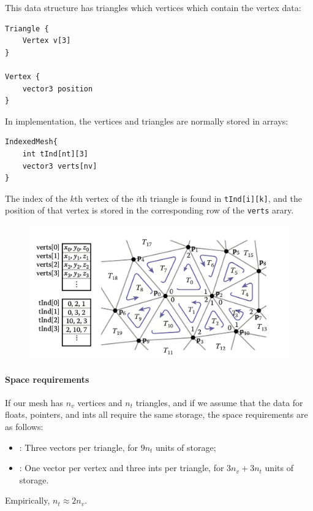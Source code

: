 \documentclass[11pt]{article}
\numberwithin{equation}{section}
\begin{document}
This data structure has triangles which  vertices which contain the vertex data:
\begin{framed}
\begin{verbatim}
Triangle {
	Vertex v[3]
}

Vertex {
	vector3 position
}
\end{verbatim}
\end{framed}
In implementation, the vertices and triangles are normally stored in arrays:
\begin{framed}
\begin{verbatim}
IndexedMesh{
	int tInd[nt][3]
	vector3 verts[nv]
}
\end{verbatim}
\end{framed}
\noindent The index of the $k$th vertex of the $i$th triangle is found in \texttt{tInd[i][k]}, and the position of that vertex is stored in the corresponding row of the \texttt{verts} arary.
	\begin{figure}[H]
	\centering
	\includegraphics[scale=0.6]{p18}
	\end{figure}
\paragraph{Space requirements}
If our mesh has $n_v$ vertices and $n_t$ triangles, and if we assume that the data for floats, pointers, and ints all require the same storage, the space requirements are as follows:
\begin{itemize}
	\item {}: Three vectors per triangle, for $9n_t$ units of storage;
	\item {}: One vector per vertex and three ints per triangle, for $3n_v + 3n_t$ units of storage.
\end{itemize}
Empirically, $n_t \approx 2n_v$.
\end{document}
